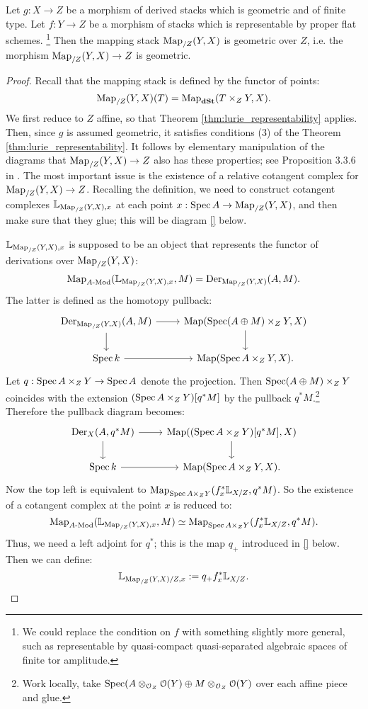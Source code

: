 \begin{thm}
\label{thm:mapping_stack_geometric}
Let $g: X \to Z$ be a morphism of derived stacks which is geometric and of finite type. Let $f:Y\to Z$ be a morphism of stacks
which is representable by proper flat schemes. \footnote{We could replace the condition on $f$ with something slightly more
general, such as representable by quasi-compact quasi-separated algebraic spaces of finite tor amplitude.} Then 
the mapping stack $\operatorname{Map}_{/Z}(Y,X)$ is geometric
over $Z$, i.e. the morphism $\operatorname{Map}_{/Z}(Y,X) \to Z$ is geometric.
\end{thm}
\begin{proof}
Recall that the mapping stack is defined by the functor of points:
\[	 \operatorname{Map}_{/Z}(Y,X) (T) = \operatorname{Map}_{\mathbf{dSt}}(T\times_Z Y, X). 	\]
We first reduce to $Z$ affine, so that Theorem \ref{thm:lurie_representability} applies.
Then, since $g$ is assumed geometric, it satisfies conditions (3) of the Theorem \ref{thm:lurie_representability}. 
It follows by elementary manipulation
of the diagrams that $\operatorname{Map}_{/Z}(Y,X) \to Z$ also has these properties; see Proposition 3.3.6 in \cite{DAG-XIV}.
The most important issue is the existence of a relative cotangent complex for $\operatorname{Map}_{/Z}(Y,X) \to Z$. 
Recalling the definition, we need to construct cotangent complexes $\mathbb L_{\operatorname{Map}_{/Z}(Y,X),x}$ at each point 
$x: \operatorname{Spec} A \to \operatorname{Map}_{/Z}(Y,X)$, and then make sure that they glue; this will be diagram \ref{} below.

$\mathbb L_{\operatorname{Map}_{/Z}(Y,X),x}$ is supposed to be an object that represents the functor of derivations over $\operatorname{Map}_{/Z}(Y,X)$:
\[	\operatorname{Map}_{A\textrm{-}\mathrm{Mod}}(\mathbb L_{\operatorname{Map}_{/Z}(Y,X),x}, M) = \operatorname{Der}_{\operatorname{Map}_{/Z}(Y,X)}(A,M) .	\]
The latter is defined as the homotopy pullback:
\[
\begin{tikzcd}
\Der_{\Map_{/Z}(Y,X)}(A,M)\arrow{r}\arrow{d} & \Map(\Spec(A\oplus M) \times_Z Y, X)\arrow{d} \\
\Spec k\arrow{r} & \Map(\Spec A \times_Z Y, X).
\end{tikzcd}
\]
Let $q: \operatorname{Spec} A \times_Z Y \to \operatorname{Spec} A$ denote the projection. Then $\operatorname{Spec}(A\oplus M) \times_Z Y$ coincides with the extension
$(\operatorname{Spec} A \times_Z Y)[q^*M]$ by the pullback $q^*M$.\footnote{Work locally, take 
$\operatorname{Spec}(A \otimes_{\mathcal{O}_Z} \mathcal{O}(Y) \oplus M\otimes_{\mathcal{O}_Z} \mathcal{O}(Y)$ over each affine piece and glue.}
Therefore the pullback diagram becomes:
\[
\begin{tikzcd}
\Der_{X}(A,q^*M)\arrow{r}\arrow{d} & \Map((\Spec A \times_Z Y) [q^*M], X)\arrow{d} \\
\Spec k\arrow{r} & \Map(\Spec A \times_Z Y, X).
\end{tikzcd}
\]
Now the top left is equivalent to $\operatorname{Map}_{\operatorname{Spec} A \times_Z Y}(f_x^*\mathbb L_{X/Z}, q^*M)$. So the existence of a cotangent complex at the
point $x$ is reduced to:
\[	\operatorname{Map}_{A\textrm{-}\mathrm{Mod}}(\mathbb L_{\operatorname{Map}_{/Z}(Y,X),x}, M) \simeq \operatorname{Map}_{\operatorname{Spec} A \times_Z Y}(f_x^*\mathbb L_{X/Z}, q^*M).	\]
Thus, we need a left adjoint for $q^*$; this is the map $q_+$ introduced in \ref{} below. Then we can define:
\begin{equation}
\label{eq:mapping_local_cotangent}
	\mathbb L_{\operatorname{Map}_{/Z}(Y,X)/Z,x} := q_+ f_x^*\mathbb L_{X/Z}.
\end{equation}


\end{proof}
